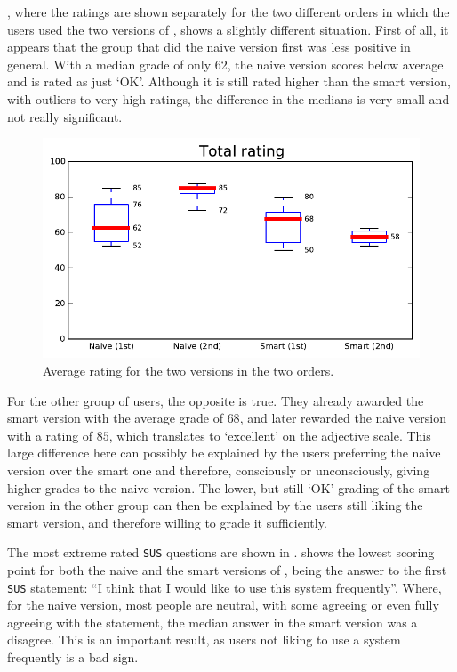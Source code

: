 , where the ratings are shown separately for the two different orders in which the users used the two versions of \oframp, shows a slightly different situation. First of all, it appears that the group that did the naive version first was less positive in general. With a median grade of only 62, the naive version scores below average and is rated as just `OK'. Although it is still rated higher than the smart version, with outliers to very high ratings, the difference in the medians is very small and not really significant.

\begin{figure}[h!]
\center
\includegraphics[width=.6\textwidth]{img/graphs/4b_10.pdf}
\caption{Average rating for the two versions in the two orders.}
\end{figure}

For the other group of users, the opposite is true. They already awarded the smart version with the average grade of $68$, and later rewarded the naive version with a rating of $85$, which translates to `excellent' on the adjective scale. This large difference here can possibly be explained by the users preferring the naive version over the smart one and therefore, consciously or unconsciously, giving higher grades to the naive version. The lower, but still `OK' grading of the smart version in the other group can then be explained by the users still liking the smart version, and therefore willing to grade it sufficiently.

The most extreme rated \verb|SUS| questions are shown in .  shows the lowest scoring point for both the naive and the smart versions of \oframp, being the answer to the first \verb|SUS| statement: ``I think that I would like to use this system frequently''. Where, for the naive version, most people are neutral, with some agreeing or even fully agreeing with the statement, the median answer in the smart version was a disagree. This is an important result, as users not liking to use a system frequently is a bad sign.

